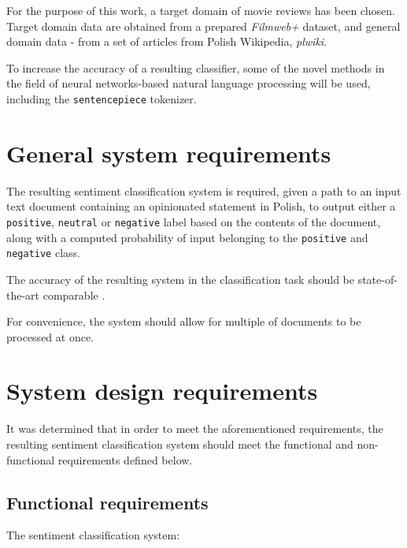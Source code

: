For the purpose of this work, a target domain of movie reviews has been chosen. Target domain data are obtained from a prepared \emph{Filmweb+} dataset, and general domain data - from a set of articles from Polish Wikipedia, \emph{plwiki}.

To increase the accuracy of a resulting classifier, some of the novel methods in the field of neural networks-based natural language processing will be used, including the \lstinline{sentencepiece} tokenizer. 

\section{General system requirements}

The resulting sentiment classification system is required, given a path to an input text document containing an opinionated statement in Polish, to output either a \lstinline{positive}, \lstinline{neutral} or \lstinline{negative} label based on the contents of the document, along with a computed probability of input belonging to the \lstinline{positive} and \lstinline{negative} class.

The accuracy of the resulting system in the classification task should be state-of-the-art comparable \cite{czaplakardas:ulmfit, korzeniowski:poleval}.

For convenience, the system should allow for multiple of documents to be processed at once.

\section{System design requirements}
\label{requirements}

It was determined that in order to meet the aforementioned requirements, the resulting sentiment classification system should meet the functional and non-functional requirements defined below.

\subsection{Functional requirements}

The sentiment classification system:

